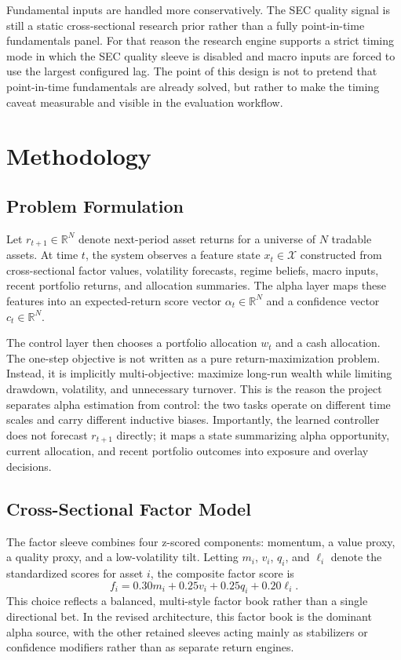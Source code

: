 \documentclass[11pt]{article}
\begin{document}
Fundamental inputs are handled more conservatively. The SEC quality signal is
still a static cross-sectional research prior rather than a fully point-in-time
fundamentals panel. For that reason the research engine supports a strict timing
mode in which the SEC quality sleeve is disabled and macro inputs are forced to
use the largest configured lag. The point of this design is not to pretend that
point-in-time fundamentals are already solved, but rather to make the timing
caveat measurable and visible in the evaluation workflow.

\section{Methodology}

\subsection{Problem Formulation}

Let $r_{t+1} \in \mathbb{R}^N$ denote next-period asset returns for a universe of
$N$ tradable assets. At time $t$, the system observes a feature state
$x_t \in \mathcal{X}$ constructed from cross-sectional factor values,
volatility forecasts, regime beliefs, macro inputs, recent portfolio returns,
and allocation summaries. The alpha layer maps these features into an
expected-return score vector $\alpha_t \in \mathbb{R}^N$ and a confidence
vector $c_t \in \mathbb{R}^N$.

The control layer then chooses a portfolio allocation $w_t$ and a cash
allocation. The one-step objective is not written as a pure return-maximization
problem. Instead, it is implicitly multi-objective: maximize long-run wealth
while limiting drawdown, volatility, and unnecessary turnover. This is the
reason the project separates alpha estimation from control: the two tasks
operate on different time scales and carry different inductive biases.
Importantly, the learned controller does not forecast $r_{t+1}$ directly; it
maps a state summarizing alpha opportunity, current allocation, and recent
portfolio outcomes into exposure and overlay decisions.

\subsection{Cross-Sectional Factor Model}

The factor sleeve combines four z-scored components: momentum, a value proxy, a
quality proxy, and a low-volatility tilt. Letting $m_i$, $v_i$, $q_i$, and
$\ell_i$ denote the standardized scores for asset $i$, the composite factor
score is
\[
f_i = 0.30 m_i + 0.25 v_i + 0.25 q_i + 0.20 \ell_i.
\]
This choice reflects a balanced, multi-style factor book rather than a single
directional bet. In the revised architecture, this factor book is the dominant
alpha source, with the other retained sleeves acting mainly as stabilizers or
confidence modifiers rather than as separate return engines.
\end{document}
